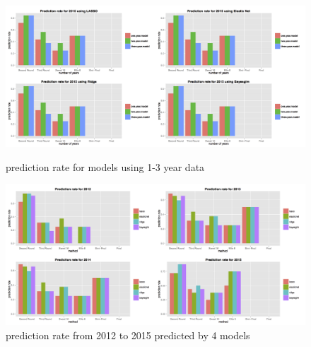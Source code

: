 \documentclass{article} %
\begin{document}
\begin{figure}[H]
\begin{center}
   \includegraphics[scale = 0.17]{year.jpg}
\end{center}
\caption{prediction rate for models using 1-3 year data}

\begin{center}
   \includegraphics[scale = 0.17]{model.jpg}
\end{center}
\caption{prediction rate from 2012 to 2015 predicted by 4 models}
\end{figure}
\end{document}
